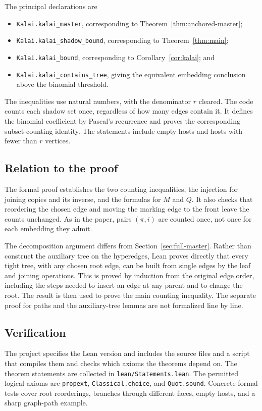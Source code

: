 \documentclass[11pt]{article}
\numberwithin{equation}{section}
\theoremstyle{definition}
\begin{document}
The principal declarations are
\begin{itemize}[leftmargin=*]
\item \texttt{Kalai.kalai\_master}, corresponding to
      Theorem~\ref{thm:anchored-master};
\item \texttt{Kalai.kalai\_shadow\_bound}, corresponding to
      Theorem~\ref{thm:main};
\item \texttt{Kalai.kalai\_bound}, corresponding to
      Corollary~\ref{cor:kalai}; and
\item \texttt{Kalai.kalai\_contains\_tree}, giving the equivalent
      embedding conclusion above the binomial threshold.
\end{itemize}
The inequalities use natural numbers, with the denominator $r$ cleared.
The code counts each shadow set once, regardless of how many edges
contain it.  It defines the binomial coefficient by Pascal's recurrence
and proves the corresponding subset-counting identity.  The statements
include empty hosts and hosts with fewer than $r$ vertices.

\subsection{Relation to the proof}

The formal proof establishes the two counting inequalities, the
injection for joining copies and its inverse, and the formulas for
$M$ and $Q$.  It also checks that reordering the chosen edge and
moving the marking edge to the front leave the counts unchanged.
As in the paper, pairs $(\pi,i)$ are counted once, not once for each
embedding they admit.

The decomposition argument differs from
Section~\ref{sec:full-master}.  Rather than construct the auxiliary
tree on the hyperedges, Lean proves directly that every tight tree,
with any chosen root edge, can be built from single edges by the
leaf and joining operations.  This is proved by induction from the
original edge order, including the steps needed to insert an edge
at any parent and to change the root.  The result is then used to
prove the main counting inequality.  The separate proof for paths
and the auxiliary-tree lemmas are not formalized line by line.

\subsection{Verification}

The project specifies the Lean version and includes the source files
and a script that compiles them and checks which axioms the theorems
depend on.  The theorem statements are collected in
\texttt{lean/Statements.lean}.  The permitted
logical axioms are \texttt{propext}, \texttt{Classical.choice}, and
\texttt{Quot.sound}.  Concrete formal tests cover root reorderings,
branches through different faces, empty hosts, and a sharp graph-path
example.
\end{document}
